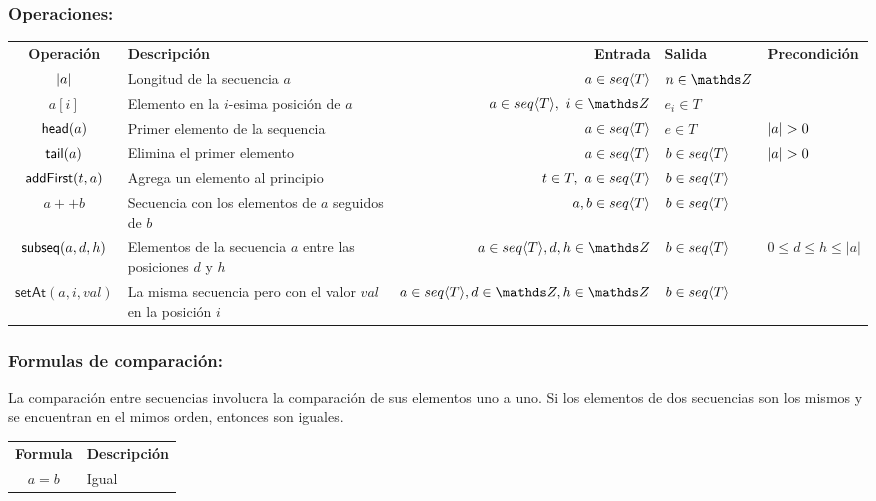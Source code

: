 \subsubsection*{Operaciones:}
\begin{tabular}{cp{6cm}rll}
	\textbf{Operación} & \textbf{Descripción} & \textbf{Entrada} & \textbf{Salida} & \textbf{Precondición}\\
	$|a|$ &  Longitud de la secuencia $a$ & $a\in seq \langle T\rangle$ & $n \in \ent$\\
	$a[i]$ & Elemento en la $i$-esima posición de $a$ & $a\in\TLista{T},~i\in\ent$ & $e_i \in T$ \\
	$\mathsf{head}(a)$ & Primer elemento de la sequencia & $a\in seq \langle T\rangle$ & $e\in T$ & $|a| > 0$ \\
	$\mathsf{tail}(a)$ & Elimina el primer elemento & $a\in seq \langle T\rangle$ & $b\in seq \langle T\rangle$ & $|a| > 0$ \\
	$\mathsf{addFirst}(t,a)$ & Agrega un elemento al principio & $t\in T, ~a\in seq \langle T\rangle$ & $b\in seq \langle T\rangle$ &  \\
	$a ++ b$ & Secuencia con los elementos de $a$ seguidos de $b$ & $a,b\in seq \langle T\rangle$ & $b\in seq \langle T\rangle$ & \\
	$\mathsf{subseq}(a,d,h)$ & Elementos de la secuencia $a$ entre las posiciones $d$ y $h$ & $a\in\TLista{T}, d,h\in\ent$ & $b\in seq \langle T\rangle$ & $0\leq d \leq h \leq |a|$ \\
	$\mathsf{setAt}(a,i,val)$ & La misma secuencia pero con el valor $val$ en la posición $i$ & $a\in\TLista{T}, d\in\ent,h\in\ent$ & $b\in seq \langle T\rangle$ & \\
\end{tabular}

\subsubsection*{Formulas de comparación:}
La comparación entre secuencias involucra la comparación de sus elementos uno a uno. Si los elementos de dos secuencias son los mismos y se encuentran en el mimos orden, entonces son iguales.

\vspace*{2mm}
\begin{tabular}{cl}
	\textbf{Formula} & \textbf{Descripción} \\
	$a = b$ & Igual\\
\end{tabular}


